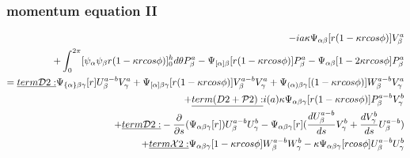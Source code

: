 \documentclass{Note}
\begin{document}
\subsubsection{momentum equation II}
\begin{equation}
\begin{aligned}
-ia\kappa \Psi_{\alpha\beta}[r(1-\kappa rcos\phi)]V_\beta^a\\
+\int_0^{2\pi}  [{\psi_\alpha \psi_\beta   r(1-\kappa r cos\phi)}]_0^h d\theta P_\beta^a
-\Psi_{[\alpha]\beta}[r(1-\kappa r cos\phi)]P_\beta^a-\Psi_{\alpha\beta}[1-2\kappa r cos\phi]P_\beta^a\\
=
\underline{term \mathcal{D}2:}  \Psi_{\{\alpha\}\beta\gamma} [r]U_\beta^{a-b}V_\gamma^a
+\Psi_{[\alpha]\beta\gamma} [r(1-\kappa rcos\phi)]V_\beta^{a-b}V_\gamma^a
+ \Psi_{(\alpha)\beta\gamma} [(1-\kappa rcos\phi)]W_\beta^{a-b}V_\gamma^a\\
+\underline{term\mathcal({D}2+\mathcal{P}2):}  i(a)\kappa \Psi_{\alpha\beta\gamma}[r(1-\kappa r cos\phi)]P_\beta^{a-b}V_\gamma^{b}\\
+\underline{term \mathcal{D}2:} -{{\partial }\over {\partial s}}(\Psi_{\alpha\beta\gamma}[r])U_\beta^{a-b}U_\gamma^{b}
-\Psi_{\alpha\beta\gamma}[r]({{d U_\beta^{a-b} \over {d s}}V_\gamma^{b}}+{dV_\gamma^{b}\over ds}U_\beta^{a-b})\\
+\underline{term \mathcal{X}2:}  \Psi_{\alpha\beta\gamma}[1-\kappa rcos\phi]W_\beta^{a-b}W_\gamma^b-\kappa \Psi_{\alpha\beta\gamma}[r cos\phi]U_\beta^{a-b}U_\gamma^b\\
\end{aligned}
\end{equation}
\end{document}
